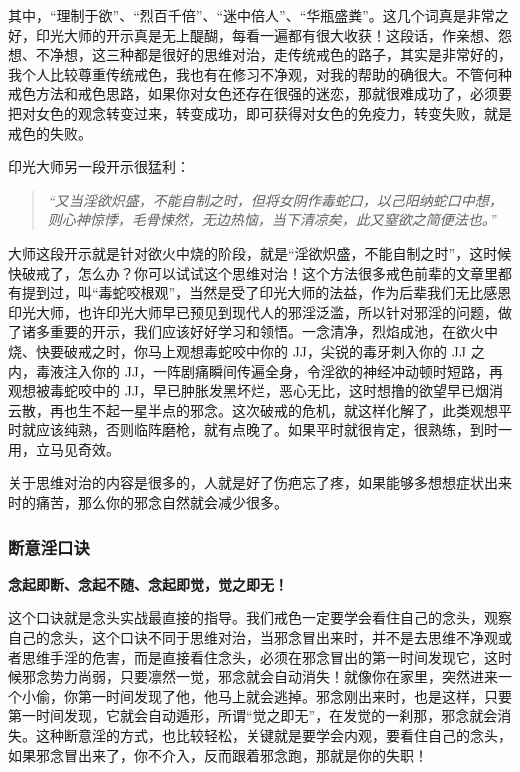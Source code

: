 \documentclass{ctexart}
\begin{document}
其中，“理制于欲”、“烈百千倍”、“迷中倍人”、“华瓶盛粪”。这几个词真是非常之好，印光大师的开示真是无上醍醐，每看一遍都有很大收获！这段话，作亲想、怨想、不净想，这三种都是很好的思维对治，走传统戒色的路子，其实是非常好的，我个人比较尊重传统戒色，我也有在修习不净观，对我的帮助的确很大。不管何种戒色方法和戒色思路，如果你对女色还存在很强的迷恋，那就很难成功了，必须要把对女色的观念转变过来，转变成功，即可获得对女色的免疫力，转变失败，就是戒色的失败。

印光大师另一段开示很猛利：

\begin{quote}\it
    “又当淫欲炽盛，不能自制之时，但将女阴作毒蛇口，以己阳纳蛇口中想，则心神惊悸，毛骨悚然，无边热恼，当下清凉矣，此又窒欲之简便法也。”
\end{quote}

大师这段开示就是针对欲火中烧的阶段，就是“淫欲炽盛，不能自制之时”，这时候快破戒了，怎么办？你可以试试这个思维对治！这个方法很多戒色前辈的文章里都有提到过，叫“毒蛇咬根观”，当然是受了印光大师的法益，作为后辈我们无比感恩印光大师，也许印光大师早已预见到现代人的邪淫泛滥，所以针对邪淫的问题，做了诸多重要的开示，我们应该好好学习和领悟。一念清净，烈焰成池，在欲火中烧、快要破戒之时，你马上观想毒蛇咬中你的 JJ，尖锐的毒牙刺入你的 JJ 之内，毒液注入你的 JJ，一阵剧痛瞬间传遍全身，令淫欲的神经冲动顿时短路，再观想被毒蛇咬中的 JJ，早已肿胀发黑坏烂，恶心无比，这时想撸的欲望早已烟消云散，再也生不起一星半点的邪念。这次破戒的危机，就这样化解了，此类观想平时就应该纯熟，否则临阵磨枪，就有点晚了。如果平时就很肯定，很熟练，到时一用，立马见奇效。

关于思维对治的内容是很多的，人就是好了伤疤忘了疼，如果能够多想想症状出来时的痛苦，那么你的邪念自然就会减少很多。

\subsubsection{断意淫口诀}

\begin{center}\bf
    念起即断、念起不随、念起即觉，觉之即无！
\end{center}

这个口诀就是念头实战最直接的指导。我们戒色一定要学会看住自己的念头，观察自己的念头，这个口诀不同于思维对治，当邪念冒出来时，并不是去思维不净观或者思维手淫的危害，而是直接看住念头，必须在邪念冒出的第一时间发现它，这时候邪念势力尚弱，只要凛然一觉，邪念就会自动消失！就像你在家里，突然进来一个小偷，你第一时间发现了他，他马上就会逃掉。邪念刚出来时，也是这样，只要第一时间发现，它就会自动遁形，所谓“觉之即无”，在发觉的一刹那，邪念就会消失。这种断意淫的方式，也比较轻松，关键就是要学会内观，要看住自己的念头，如果邪念冒出来了，你不介入，反而跟着邪念跑，那就是你的失职！
\end{document}
